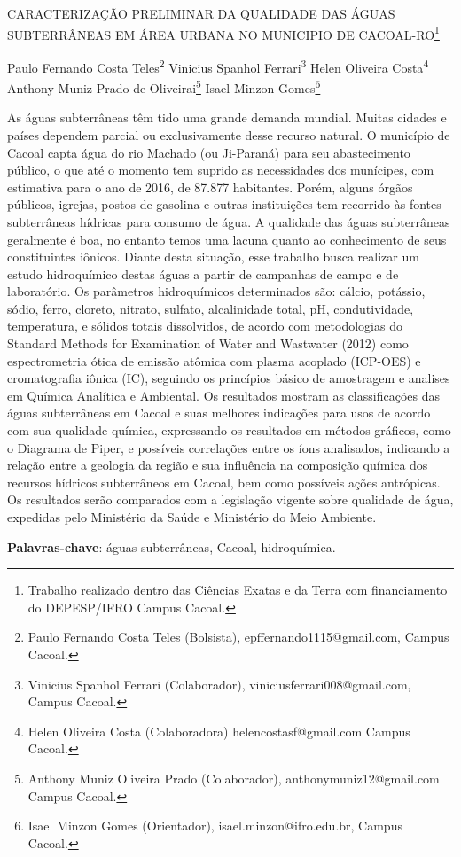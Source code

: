 \documentclass[article,12pt,onesidea,4paper,english,brazil]{abntex2}
\begin{document}
	
	
	\frenchspacing 
	
	\begin{center}
		\LARGE CARACTERIZAÇÃO PRELIMINAR DA QUALIDADE DAS ÁGUAS SUBTERRÂNEAS EM ÁREA URBANA NO MUNICIPIO DE CACOAL-RO\footnote{Trabalho realizado dentro das Ciências Exatas e da Terra com financiamento do DEPESP/IFRO Campus Cacoal.}
		
		\normalsize
		Paulo Fernando Costa Teles\footnote{Paulo Fernando Costa Teles (Bolsista), epffernando1115@gmail.com, Campus Cacoal.} 
	Vinicius Spanhol Ferrari\footnote{Vinicius Spanhol Ferrari (Colaborador), viniciusferrari008@gmail.com, Campus Cacoal.} 
		Helen Oliveira Costa\footnote{Helen Oliveira Costa (Colaboradora) helencostasf@gmail.com Campus Cacoal.} 
		Anthony Muniz Prado de Oliveirai\footnote{Anthony Muniz Oliveira Prado (Colaborador), anthonymuniz12@gmail.com Campus Cacoal.}
		Isael Minzon Gomes\footnote{Isael Minzon Gomes (Orientador), isael.minzon@ifro.edu.br, Campus Cacoal.} 
	\end{center}
	
	\noindent As águas subterrâneas têm tido uma grande demanda mundial. Muitas cidades e países dependem parcial ou exclusivamente desse recurso natural. O município de Cacoal capta água do rio Machado (ou Ji-Paraná) para seu abastecimento público, o que até o momento tem suprido as necessidades dos munícipes, com estimativa para o ano de 2016, de 87.877 habitantes. Porém, alguns órgãos públicos, igrejas, postos de gasolina e outras instituições tem recorrido às fontes subterrâneas hídricas para consumo de água. A qualidade das águas subterrâneas geralmente é boa, no entanto temos uma lacuna quanto ao conhecimento de seus constituintes iônicos. Diante desta situação, esse trabalho busca realizar um estudo hidroquímico destas águas a partir de campanhas de campo e de laboratório. Os parâmetros hidroquímicos determinados são: cálcio, potássio, sódio, ferro, cloreto, nitrato, sulfato, alcalinidade total, pH, condutividade, temperatura, e sólidos totais dissolvidos, de acordo com metodologias do Standard Methods for Examination of Water and Wastwater (2012) como espectrometria ótica de emissão atômica com plasma acoplado (ICP-OES) e cromatografia iônica (IC), seguindo os princípios básico de amostragem e analises em Química Analítica e Ambiental. Os resultados mostram as classificações das águas subterrâneas em Cacoal e suas melhores indicações para usos de acordo com sua qualidade química, expressando os resultados em métodos gráficos, como o Diagrama de Piper, e possíveis correlações entre os íons analisados, indicando a relação entre a geologia da região e sua influência na composição química dos recursos hídricos subterrâneos em Cacoal, bem como possíveis ações antrópicas. Os resultados serão comparados com a legislação vigente sobre qualidade de água, expedidas pelo Ministério da Saúde e Ministério do Meio Ambiente.
	
	\vspace{\onelineskip}
	
	\noindent
	\textbf{Palavras-chave}: águas subterrâneas, Cacoal, hidroquímica.
	
\end{document}
